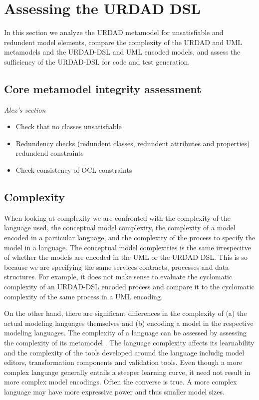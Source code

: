 \section{Assessing the URDAD DSL \label{sec:assessment}}

In this section we analyze the URDAD metamodel for unsatisfiable and redundent model elements, compare the complexity of the URDAD and UML metamodels and the URDAD-DSL and UML encoded models, and assess the sufficiency of the URDAD-DSL for code and test generation.


\subsection{Core metamodel integrity assessment}

\emph{Alex's section}


\begin{itemize}
  \item Check that no classes unsatisfiable
  \item Redundency checks (redundent classes, redundent attributes and properties) redundend constraints
  \item Check consistency of OCL constraints
\end{itemize}


\subsection{Complexity}

When looking at complexity we are confronted with the complexity of the language used, the conceptual model complexity, the complexity of a model encoded in a particular language, and the complexity of the process to specify the model in a language. The conceptual model complexities is the same irrespecitve of whether the models are encoded in the UML or the URDAD DSL. This is so because we are specifying the same services contracts, processes and data structures. For example, it does not make sense to evaluate the cyclomatic complexity \cite{mccabe_complexity_1976} of an URDAD-DSL encoded process and compare it to the cyclomatic complexity of the same process in a UML encoding.

On the other hand, there are significant differences in the complexity of (a) the actual modeling languages themselves and (b) encoding a model in the respective modeling languages. The complexity of a language can be assessed by assessing the complexity of its metamodel \cite{mohagheghi_evaluating_2007}. The language complexity affects its learnability and the complexity of the tools developed around the language includig model editors, transformation components and validation tools. Even though a more complex language generally entails a steeper learning curve, it need not result in more complex model encodings. Often the converse is true. A more complex language may have more expressive power and thus smaller model sizes. 

